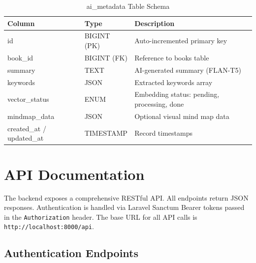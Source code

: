 \begin{table}[H]
\centering
\caption{ai\_metadata Table Schema}
\begin{tabularx}{\textwidth}{|l|l|X|}
\hline
\textbf{Column} & \textbf{Type} & \textbf{Description} \\
\hline
id              & BIGINT (PK)  & Auto-incremented primary key \\
\hline
book\_id        & BIGINT (FK)  & Reference to books table \\
\hline
summary         & TEXT         & AI-generated summary (FLAN-T5) \\
\hline
keywords        & JSON         & Extracted keywords array \\
\hline
vector\_status  & ENUM         & Embedding status: pending, processing, done \\
\hline
mindmap\_data   & JSON         & Optional visual mind map data \\
\hline
created\_at / updated\_at & TIMESTAMP & Record timestamps \\
\hline
\end{tabularx}
\end{table}

\section{API Documentation}
\label{sec:ch4api}

The backend exposes a comprehensive RESTful API. All endpoints return JSON
responses. Authentication is handled via Laravel Sanctum Bearer tokens passed
in the \texttt{Authorization} header. The base URL for all API calls is
\texttt{http://localhost:8000/api}.

\subsection{Authentication Endpoints}


